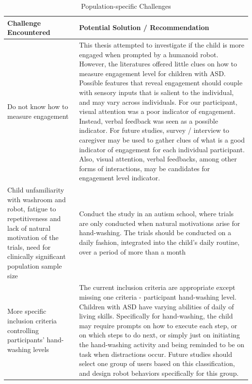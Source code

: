 \documentclass{ut-thesis}
\begin{document}
\begin{table}[H]
	\centering
	\begin{tabular}{ | p{5cm} | p{10cm} | }
		\hline
		\textbf{Challenge Encountered}	&	\textbf{Potential Solution / Recommendation} \\	\hline
		Do not know how to measure engagement	&	This thesis attempted to investigate if the child is more engaged when prompted by a humanoid robot.  However, the literatures offered little clues on how to measure engagement level for children with ASD.  Possible features that reveal engagement should couple with sensory inputs that is salient to the individual, and may vary across individuals.  For our participant, visual attention was a poor indicator of engagement.  Instead, verbal feedback was seen as a possible indicator.  For future studies, survey / interview to caregiver may be used to gather clues of what is a good indicator of engagement for each individual participant.  Also, visual attention, verbal feedbacks, among other forms of interactions, may be candidates for engagement level indicator.	\\	\hline
		Child unfamiliarity with washroom and robot, fatigue to repetitiveness and lack of natural motivation of the trials, need for clinically significant population sample size	&	Conduct the study in an autism school, where trials are only conducted when natural motivations arise for hand-washing.  The trials should be conducted on a daily fashion, integrated into the child's daily routine, over a period of more than a month	\\	\hline
		More specific inclusion criteria controlling participants' hand-washing levels	&	The current inclusion criteria are appropriate except missing one criteria - participant hand-washing level.  Children with ASD have varying abilities of daily of living skills.  Specifically for hand-washing, the child may require prompts on how to execute each step, or on which steps to do next, or simply just on initiating the hand-washing activity and being reminded to be on task when distractions occur.  Future studies should select one group of users based on this classification, and design robot behaviors specifically for this group.	\\	\hline
	\end{tabular}
	\caption{Population-specific Challenges}
	\label{tab:PopulationChallenge}
\end{table}
\end{document}
